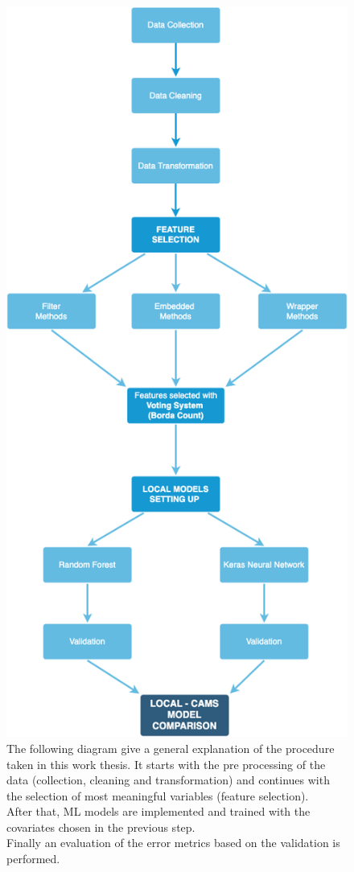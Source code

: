 \begin{figure}[H]
    \centering
    \includegraphics[scale=0.35]{images/overview.png}
    \caption{The following diagram give a general explanation of the procedure taken in this work thesis. It starts with the pre processing of the data (collection, cleaning and transformation) and continues with the selection of most meaningful variables (feature selection). \\
    After that, ML models are implemented and trained with the covariates chosen in the previous step. \\
    Finally an evaluation of the error metrics based on the validation is performed.}
    \label{fig:overview}
\end{figure}


